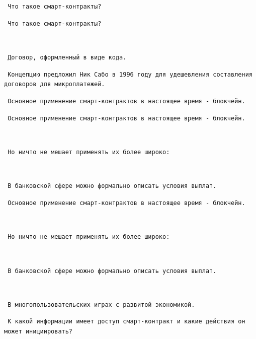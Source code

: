 \documentclass[11pt,handout,pdf,hyperref={unicode}]{beamer}
\begin{document}
\begin{frame}[fragile]

\texttt{ Что такое смарт-контракты? }

\end{frame}

\begin{frame}[fragile]

\texttt{ Что такое смарт-контракты? }

\texttt{ }

\texttt{ Договор, оформленный в виде кода. }

\texttt{ Концепцию предложил Ник Сабо в 1996 году для удешевления составления договоров для микроплатежей. }

\end{frame}

\begin{frame}[fragile]

\texttt{ Основное применение смарт-контрактов в настоящее время - блокчейн. }

\end{frame}

\begin{frame}[fragile]

\texttt{ Основное применение смарт-контрактов в настоящее время - блокчейн. }

\texttt{ }

\texttt{ Но ничто не мешает применять их более широко: }

\texttt{ }

\texttt{ В банковской сфере можно формально описать условия выплат. }

\end{frame}

\begin{frame}[fragile]

\texttt{ Основное применение смарт-контрактов в настоящее время - блокчейн. }

\texttt{ }

\texttt{ Но ничто не мешает применять их более широко: }

\texttt{ }

\texttt{ В банковской сфере можно формально описать условия выплат. }

\texttt{ }

\texttt{ В многопользовательских играх с развитой экономикой. }

\end{frame}

\begin{frame}[fragile]

\texttt{ К какой информации имеет доступ смарт-контракт и какие действия он может инициировать? }

\end{frame}
\end{document}
